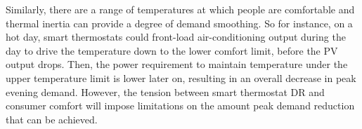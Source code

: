 \documentclass{homework}
\begin{document}
\begin{letterenum}
\begin{letterenum}
        \indent Similarly, there are a range of temperatures at which people are
        comfortable and thermal inertia can provide a degree of demand smoothing.
        So for instance, on a hot day,
        smart thermostats could front-load air-conditioning output during the day to drive the
        temperature down to the lower comfort limit, before the PV output drops.
        Then, the power requirement to maintain temperature under the upper
        temperature limit is lower later on, resulting in an overall
        decrease in peak evening demand. However, the tension between 
        smart thermostat DR and consumer
        comfort will impose limitations on the amount peak demand reduction
        that can be achieved.


\end{letterenum}
    






\end{letterenum}
\end{document}
